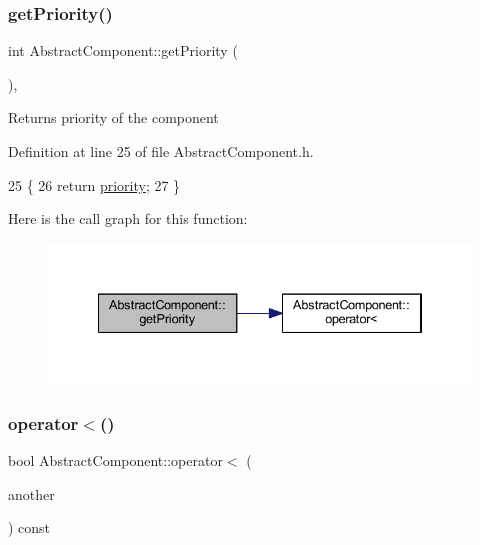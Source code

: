 \subsubsection{\texorpdfstring{get\+Priority()}{getPriority()}}
{\footnotesize\ttfamily int Abstract\+Component\+::get\+Priority (\begin{DoxyParamCaption}{ }\end{DoxyParamCaption})\hspace{0.3cm}{\ttfamily [inline]}, {\ttfamily [inherited]}}

\begin{DoxyReturn}{Returns}
priority of the component 
\end{DoxyReturn}


Definition at line 25 of file Abstract\+Component.\+h.


\begin{DoxyCode}
25                       \{
26         \textcolor{keywordflow}{return} \hyperlink{class_abstract_component_aff57dfa5f31be093a06b55560e33fb95}{priority};
27     \}
\end{DoxyCode}
Here is the call graph for this function\+:
\nopagebreak
\begin{figure}[H]
\begin{center}
\leavevmode
\includegraphics[width=334pt]{class_abstract_component_ac0b440d1d642ff1292ec3c544d75a8f1_cgraph}
\end{center}
\end{figure}
\mbox{\label{class_abstract_component_a0c2e458144111c5f599c66f168516abc}} 
\subsubsection{\texorpdfstring{operator$<$()}{operator<()}}
{\footnotesize\ttfamily bool Abstract\+Component\+::operator$<$ (\begin{DoxyParamCaption}\item[{const \hyperlink{class_abstract_component}{Abstract\+Component} \&}]{another }\end{DoxyParamCaption}) const\hspace{0.3cm}{\ttfamily [inherited]}}



